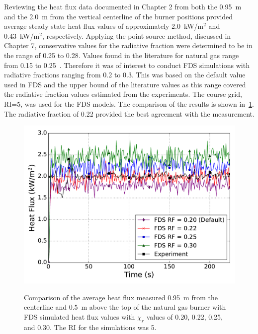 \documentclass[twoside]{uocthesis}
\begin{document}
{Reviewing the heat flux data documented in Chapter 2 from both the 0.95~m  and the 2.0~m from the vertical centerline of the burner positions provided average steady state heat flux values of approximately 2.0~kW/m$^2$ and 0.43~kW/m$^2$, respectively.  Applying the point source method, discussed in Chapter 7, conservative values for the radiative fraction were determined to be in the range of 0.25 to 0.28.  Values found in the literature for natural gas range from 0.15 to 0.25~\cite{Modak:1977,Hostikka:3}.   
Therefore it was of interest to conduct FDS simulations with radiative fractions ranging from 0.2 to 0.3.  This was based on the default value used in FDS and the upper bound of the literature values as this range covered the radiative fraction values estimated from the experiments.  The course grid, RI=5, was used for the FDS models.  The comparison of the results is shown in~\ref{FHNG01_HF_RI5}.  The radiative fraction of 0.22 provided the best agreement with the measurement.  

\begin{figure}
	\includegraphics[width=5in]{../Figures/FHNG01_HF_RI5} \\
	\caption[Comparison of the average heat flux measured 0.95~m from the centerline and 0.5~m above the top of the natural gas burner with FDS simulated heat flux values based on varied $\chi_r$ values.]{Comparison of the average heat flux measured 0.95~m from the centerline and 0.5~m above the top of the natural gas burner with FDS simulated heat flux values with $\chi_r$ values of 0.20, 0.22, 0.25, and 0.30.  The RI for the simulations was 5.}
	\label{FHNG01_HF_RI5}
\end{figure}

}
\end{document}
